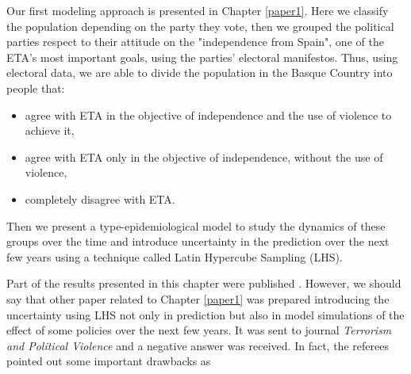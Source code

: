 Our first modeling approach is presented in Chapter \ref{paper1}. Here we classify the population depending on the party they vote, then we grouped the political parties respect to their attitude on the "independence from Spain", one of the ETA's most important goals, using the parties' electoral manifestos. Thus, using electoral data, we are able to divide the population in the Basque Country into people that:

\begin{itemize}
\item agree with ETA in the objective of independence and the use of violence to achieve it,
\item agree with ETA only in the objective of independence, without the use of violence,
\item completely disagree with ETA.
\end{itemize}

Then we present a type-epidemiological model to study the dynamics of these groups over the time and introduce uncertainty in the prediction over the next few years using a technique called Latin Hypercube Sampling (LHS). 

Part of the results presented in this chapter were published \cite{NOS1}. However, we should say that other paper related to Chapter \ref{paper1} was prepared introducing the uncertainty using LHS not only in prediction but also in model simulations of the effect of some policies over the next few years. It was sent to journal \textit{Terrorism and Political Violence} and a negative answer was received. In fact, the referees pointed out some important drawbacks as  

